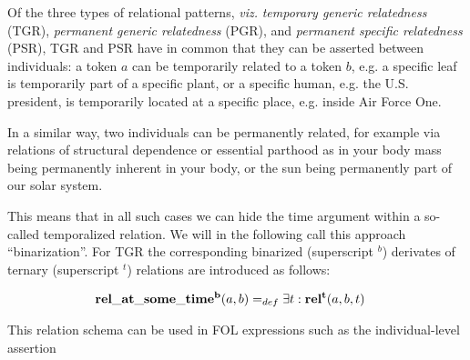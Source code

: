 Of the three types of relational patterns, \emph{viz.} \emph{temporary generic relatedness} (TGR), \emph{permanent generic relatedness} (PGR), and \emph{permanent specific relatedness} (PSR), TGR and PSR have in common that they can be asserted between individuals: a token $a$ can be temporarily related to a token $b$, e.g. 
a specific leaf is temporarily part of a specific plant, or a specific human, e.g. the U.S. president, 
is temporarily located at a specific place, e.g. inside Air Force One.

In a similar way, two individuals can be permanently related, for example via relations of structural dependence or essential parthood as in 
your body mass being permanently inherent in your body, or the sun being permanently part of our solar system.

This means that in all such cases  we can hide the time argument within a so-called temporalized relation. We will in the following call this approach ``binarization''. 
For TGR the corresponding binarized (superscript $^b$) derivates of ternary (superscript $^t$) relations are introduced as follows:  

\begin{equation}
\begin{split}
\mathrm{\mathbf{rel\_at\_some\_time^b}} (a,b) =_{def}&\; \exists t: \mathrm{\mathbf{rel^t}}(a,b,t)  
\end{split}
\label{eq:temporarily:ind}
\end{equation}

This relation schema can be used in FOL expressions such as the individual-level assertion

